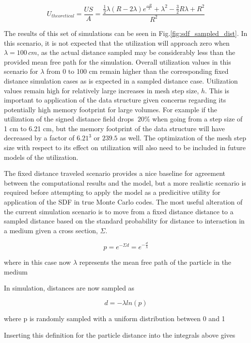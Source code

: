 \begin{equation}
  \label{eq:sampled_limit}
  U_{theoretical} = \frac{US}{A} = \frac{ \frac{1}{2} \lambda(R - 2 \lambda) e^{\frac{-R}{\lambda}} + \lambda^2 - \frac{3}{2} R \lambda + R^2 }{R^2}
\end{equation}

The results of this set of simulations can be seen in
Fig.\ref{fig:sdf_sampled_dist}. In this scenario, it is not expected that the
utilization will approach zero when $\lambda = 100\, cm$, as the actual distance
sampled may be considerably less than the provided mean free path for the
simulation. Overall utilization values in this scenario for $\lambda$ from 0 to
100 cm remain higher than the corresponding fixed distance simulation cases as
is expected in a sampled distance case. Utilization values remain high for
relatively large increases in mesh step size, $h$. This is important to
application of the data structure given concerns regarding its potentially high
memory footprint for large volumes. For example if the utilization of the signed
distance field drops $~20\%$ when going from a step size of 1 cm to 6.21 cm, but
the memory footprint of the data structure will have decreased by a factor of
$6.21^3$ or $239.5$ as well. The optimization of the mesh step size with respect
to its effect on utilization will also need to be included in future models of
the utilization.

The fixed distance traveled scenario provides a nice baseline for agreement
between the computational results and the model, but a more realistic scenario
is required before attempting to apply the model as a predicitive utility for
application of the SDF in true Monte Carlo codes. The most useful alteration of
the current simulation scenario is to move from a fixed distance distance to a
sampled distance based on the standard probability for distance to interaction
in a medium given a cross section, $\Sigma$.

$$ p = e^{-\Sigma d} = e^{-\frac{d}{\lambda}} $$

where in this case now $\lambda$ represents the mean free path of the particle in the medium

In simulation, distances are now sampled as

$$ d = -\lambda ln(p) $$

where p is randomly sampled with a uniform distribution between 0 and 1

Inserting this definition for the particle distance into the integrals above
gives

